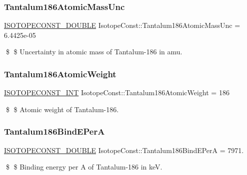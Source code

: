 \subsubsection{\texorpdfstring{Tantalum186\+Atomic\+Mass\+Unc}{Tantalum186AtomicMassUnc}}
{\footnotesize\ttfamily \mbox{\hyperlink{group___isotope_const-_macros_ga8f45a7272ce02c0b4c65c44636ed719a}{I\+S\+O\+T\+O\+P\+E\+C\+O\+N\+S\+T\+\_\+\+D\+O\+U\+B\+LE}} Isotope\+Const\+::\+Tantalum186\+Atomic\+Mass\+Unc = 6.\+4425e-\/05}

\$ \$ Uncertainty in atomic mass of Tantalum-\/186 in amu. \mbox{\label{group___isotope_const-_tantalum-_ta186_gaa72bf390f9e37f3aa5d1f9f12b46a0de}} 
\subsubsection{\texorpdfstring{Tantalum186\+Atomic\+Weight}{Tantalum186AtomicWeight}}
{\footnotesize\ttfamily \mbox{\hyperlink{group___isotope_const-_macros_ga5f18360b3e99483a35c32d789e62621c}{I\+S\+O\+T\+O\+P\+E\+C\+O\+N\+S\+T\+\_\+\+I\+NT}} Isotope\+Const\+::\+Tantalum186\+Atomic\+Weight = 186}

\$ \$ Atomic weight of Tantalum-\/186. \mbox{\label{group___isotope_const-_tantalum-_ta186_ga4c6de951f1524d1f84997eb36cf67fec}} 
\subsubsection{\texorpdfstring{Tantalum186\+Bind\+E\+PerA}{Tantalum186BindEPerA}}
{\footnotesize\ttfamily \mbox{\hyperlink{group___isotope_const-_macros_ga8f45a7272ce02c0b4c65c44636ed719a}{I\+S\+O\+T\+O\+P\+E\+C\+O\+N\+S\+T\+\_\+\+D\+O\+U\+B\+LE}} Isotope\+Const\+::\+Tantalum186\+Bind\+E\+PerA = 7971.}

\$ \$ Binding energy per A of Tantalum-\/186 in keV. \mbox{\label{group___isotope_const-_tantalum-_ta186_ga26e7acb0c73b26e491c91e134ea152f7}} 
